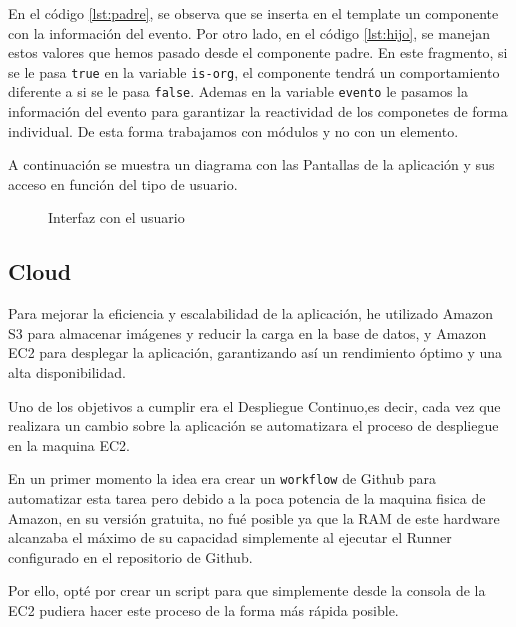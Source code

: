 En el código \ref{lst:padre}, se observa que se inserta en el template un componente con la información del evento. Por otro lado, en el código 
\ref{lst:hijo}, se manejan estos valores que hemos pasado desde el componente padre. En este fragmento, si se le pasa \texttt{true} en la variable 
\texttt{is-org}, el componente tendrá un comportamiento diferente a si se le pasa \texttt{false}. Ademas en la variable \texttt{evento} le pasamos la información
del evento para garantizar la reactividad de los componetes de forma individual. De esta forma trabajamos con módulos y no con un elemento.

\newpage
A continuación se muestra un diagrama con las Pantallas de la aplicación y sus acceso en función del tipo de usuario.
\begin{figure}[h]
    \centering
    \caption{Interfaz con el usuario}
    \label{fig:userInterface}
\end{figure}

\newpage
\subsection{Cloud}
Para mejorar la eficiencia y escalabilidad de la aplicación, he utilizado Amazon S3 para almacenar imágenes y reducir la carga en la base de datos, y 
Amazon EC2 para desplegar la aplicación, garantizando así un rendimiento óptimo y una alta disponibilidad. 

Uno de los objetivos a cumplir era el Despliegue Continuo,es decir, cada vez que realizara un cambio sobre la aplicación se automatizara el proceso 
de despliegue en la maquina EC2. 

En un primer momento la idea era crear un \texttt{workflow} de Github para automatizar esta tarea pero debido a la poca potencia de la maquina fisica de Amazon, 
en su versión gratuita, no fué posible ya que la RAM de este hardware alcanzaba el máximo de su capacidad simplemente al ejecutar el Runner configurado en el 
repositorio de Github.

Por ello, opté por crear un script para que simplemente desde la consola de la EC2 pudiera hacer este proceso de la forma más rápida posible.

